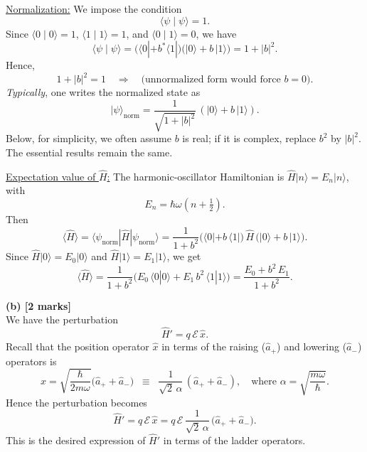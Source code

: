 \documentclass{article}
\begin{document}
\underline{Normalization:} We impose the condition 
\[
\langle \psi \mid \psi \rangle = 1.
\]
Since \(\langle 0 \mid 0\rangle = 1\), \(\langle 1 \mid 1\rangle = 1\), and \(\langle 0 \mid 1\rangle = 0\), we have
\[
\langle \psi \mid \psi \rangle 
= \bigl(\langle 0| + b^* \langle 1|\bigr)\bigl(|0\rangle + b\,|1\rangle\bigr)
= 1 + |b|^2.
\]
Hence,
\[
1 + |b|^2 = 1 
\quad\Longrightarrow\quad
\text{(unnormalized form would force }b=0\text{).}
\]
\emph{Typically}, one writes the normalized state as
\[
|\psi\rangle_{\text{norm}} 
= \frac{1}{\sqrt{1 + |b|^2}}\,(|0\rangle + b\,|1\rangle).
\]
Below, for simplicity, we often assume \(b\) is real; if it is complex, replace \(b^2\) by \(|b|^2\). The essential results remain the same.

\underline{Expectation value of \(\hat{H}\):}
The harmonic-oscillator Hamiltonian is \(\hat{H} |n\rangle = E_n |n\rangle\), with 
\[
E_n = \hbar\omega\left(n + \tfrac12\right).
\]
Then
\[
\langle \hat{H} \rangle 
= \langle\psi_{\text{norm}}|\hat{H}|\psi_{\text{norm}}\rangle
= \frac{1}{1 + b^2}
\bigl(\langle 0| + b\,\langle 1|\bigr)
\,\hat{H}\,\bigl(|0\rangle + b\,|1\rangle\bigr).
\]
Since \(\hat{H}|0\rangle = E_0|0\rangle\) and \(\hat{H}|1\rangle = E_1|1\rangle\), we get
\[
\langle \hat{H} \rangle
= \frac{1}{1 + b^2}
\bigl(E_0\,\langle 0|0\rangle + E_1\,b^2\,\langle 1|1\rangle \bigr)
= \frac{E_0 + b^2\,E_1}{1 + b^2}.
\]

\noindent
\textbf{(b) [2 marks]}\\
We have the perturbation
\[
\hat{H}' = q\,\mathcal{E}\,\hat{x}.
\]
Recall that the position operator \(\hat{x}\) in terms of the raising (\(\hat{a}_+\)) and lowering (\(\hat{a}_-\)) operators is
\[
\hat{x}
= \sqrt{\frac{\hbar}{2 m \omega}}\bigl(\hat{a}_+ + \hat{a}_-\bigr)
\;\;\equiv\;\;
\frac{1}{\sqrt{2}\,\alpha}\,(\hat{a}_+ + \hat{a}_-),
\quad
\text{where }
\alpha = \sqrt{\frac{m \omega}{\hbar}}.
\]
Hence the perturbation becomes
\[
\hat{H}' 
= q\,\mathcal{E}\,\hat{x}
= q\,\mathcal{E}\,\frac{1}{\sqrt{2}\,\alpha}\,\bigl(\hat{a}_+ + \hat{a}_-\bigr).
\]
This is the desired expression of \(\hat{H}'\) in terms of the ladder operators.
\end{document}
